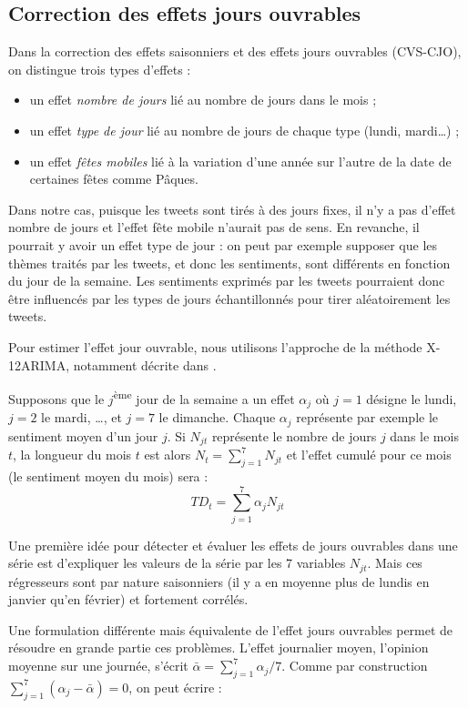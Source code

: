 \documentclass[11pt,french,french]{article}
\begin{document}
\subsection{Correction des effets jours ouvrables}\label{sec:cjo}

Dans la correction des effets saisonniers et des effets jours ouvrables
(CVS-CJO), on distingue trois types d'effets :

\begin{itemize}
\item
  un effet \emph{nombre de jours} lié au nombre de jours dans le mois ;
\item
  un effet \emph{type de jour} lié au nombre de jours de chaque type
  (lundi, mardi\dots) ;
\item
  un effet \emph{fêtes mobiles} lié à la variation d'une année sur
  l'autre de la date de certaines fêtes comme Pâques.
\end{itemize}

Dans notre cas, puisque les tweets sont tirés à des jours fixes, il n'y
a pas d'effet nombre de jours et l'effet fête mobile n'aurait pas de
sens. En revanche, il pourrait y avoir un effet type de jour : on peut
par exemple supposer que les thèmes traités par les tweets, et donc les
sentiments, sont différents en fonction du jour de la semaine. Les
sentiments exprimés par les tweets pourraient donc être influencés par
les types de jours échantillonnés pour tirer aléatoirement les tweets.

Pour estimer l'effet jour ouvrable, nous utilisons l'approche de la
méthode X-12ARIMA, notamment décrite dans \cite{L2018}.

Supposons que le \(j\)\textsuperscript{ème} jour de la semaine a un
effet \(\alpha_j\) où \(j=1\) désigne le lundi, \(j=2\) le mardi, \dots,
et \(j=7\) le dimanche. Chaque \(\alpha_j\) représente par exemple le
sentiment moyen d'un jour \(j\). Si \(N_{jt}\) représente le nombre de
jours \(j\) dans le mois \(t\), la longueur du mois \(t\) est alors
\(N_t = \sum_{j=1}^{7} N_{jt}\) et l'effet cumulé pour ce mois (le
sentiment moyen du mois) sera : \[
TD_t = \sum_{j=1}^{7} \alpha_j N_{jt}
\]

Une première idée pour détecter et évaluer les effets de jours ouvrables
dans une série est d'expliquer les valeurs de la série par les 7
variables \(N_{jt}\). Mais ces régresseurs sont par nature saisonniers
(il y a en moyenne plus de lundis en janvier qu'en février) et fortement
corrélés.

Une formulation différente mais équivalente de l'effet jours ouvrables
permet de résoudre en grande partie ces problèmes. L'effet journalier
moyen, l'opinion moyenne sur une journée, s'écrit
\(\bar{\alpha} = \sum_{j=1}^7 \alpha_j /7\). Comme par construction
\(\sum_{j=1}^7 \left(\alpha_j-\bar{\alpha}\right) = 0\), on peut écrire
:
\end{document}

